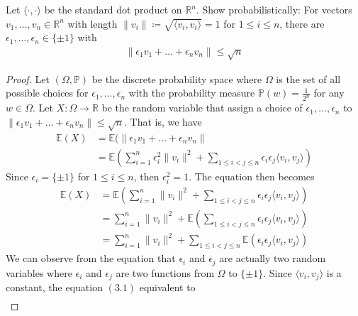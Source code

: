 \begin{problem}
  Let $\langle \cdot, \cdot \rangle$ be the standard dot product on $\mathbb{R}^{n}$. Show probabilistically: For vectors $v_{1}, \ldots, v_{n} \in \mathbb{R}^{n}$ with length $\| v_{i} \| \coloneqq \sqrt{\langle v_{i}, v_{i} \rangle} = 1$ for $1 \leq i \leq n$, there are $\epsilon_{1}, \ldots, \epsilon_{n} \in \{\pm 1\}$ with
  \begin{align*}
    \| \epsilon_{1}v_{1} + \ldots + \epsilon_{n}v_{n} \| \leq \sqrt{n}
  \end{align*}
\end{problem}
\begin{proof}
  Let $(\Omega, \mathbb{P})$ be the discrete probability space where $\Omega$ is the set of all possible choices for $\epsilon_{1}, \ldots, \epsilon_{n}$ with the probability measure $\mathbb{P}(w) = \frac{1}{2^{n}}$ for any $w \in \Omega$. Let $X: \Omega \to \mathbb{R}$ be the random variable that assign a choice of $\epsilon_{1}, \ldots, \epsilon_{n}$ to $\| \epsilon_{1}v_{1} + \ldots + \epsilon_{n}v_{n} \| \leq \sqrt{n}$. That is, we have
  \begin{align*}
    \mathbb{E}(X) &= \mathbb{E}(\| \epsilon_{1}v_{1} + \ldots + \epsilon_{n}v_{n} \| \\
                  &= \mathbb{E}(\sum_{i=1}^{n} \epsilon_{i}^{2} \|v_{i}\|^{2} + \sum_{1 \leq i < j \leq n} \epsilon_{i} \epsilon_{j} \langle v_{i}, v_{j} \rangle) 
  \end{align*}
  Since $\epsilon_{i}=\{\pm 1\}$ for $1 \leq i \leq n$, then $\epsilon_{i}^{2}=1$. The equation then becomes
  \begin{align*}
    \mathbb{E}(X) &= \mathbb{E}(\sum_{i=1}^{n} \|v_{i}\|^{2} + \sum_{1 \leq i < j \leq n} \epsilon_{i} \epsilon_{j} \langle v_{i}, v_{j} \rangle) \\
                  &= \sum_{i=1}^{n} \|v_{i}\|^{2} + \mathbb{E}(\sum_{1 \leq i < j \leq n} \epsilon_{i} \epsilon_{j} \langle v_{i}, v_{j} \rangle) \\
                  &= \sum_{i=1}^{n} \|v_{i}\|^{2} + \sum_{1 \leq i < j \leq n} \mathbb{E}(\epsilon_{i} \epsilon_{j} \langle v_{i}, v_{j} \rangle) \tag{3.1}
  \end{align*}
  We can observe from the equation that $\epsilon_{i}$ and $\epsilon_{j}$ are actually two random variables where $\epsilon_{i}$ and $\epsilon_{j}$ are two functions from $\Omega$ to $\{\pm 1\}$. Since $\langle v_{i}, v_{j} \rangle$ is a constant, the equation $(3.1)$ equivalent to
  \begin{align*}

\end{align*}
\end{proof}
